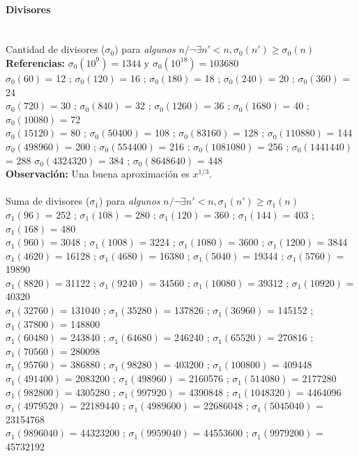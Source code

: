 {\paragraph{Divisores} \ \\
Cantidad de divisores ($\sigma_0$) para \emph{algunos} $n / \neg\exists n'<n, \sigma_0(n') \geqslant \sigma_0(n)$ \\
\textbf{Referencias:} $\sigma_0(10^9) = 1344$ y $\sigma_0(10^{18}) = 103680$ \\
$\sigma_0(60)$ = 12 ; $\sigma_0(120)$ = 16 ; $\sigma_0(180)$ = 18 ; $\sigma_0(240)$ = 20 ; $\sigma_0(360)$ = 24 \\
$\sigma_0(720)$ = 30 ; $\sigma_0(840)$ = 32 ; $\sigma_0(1260)$ = 36 ; $\sigma_0(1680)$ = 40 ; $\sigma_0(10080)$ = 72 \\ $\sigma_0(15120)$ = 80 ; $\sigma_0(50400)$ = 108 ; $\sigma_0(83160)$ = 128 ; $\sigma_0(110880)$ = 144 \\
$\sigma_0(498960)$ = 200 ; $\sigma_0(554400)$ = 216 ; $\sigma_0(1081080)$ = 256 ; $\sigma_0(1441440)$ = 288  $\sigma_0(4324320)$ = 384 ; $\sigma_0(8648640)$ = 448 \\
\textbf{Observación:} Una buena aproximación es $x^{1/3}$. \\ \\
%
Suma de divisores ($\sigma_1$) para \emph{algunos} $n / \neg\exists n'<n, \sigma_1(n') \geqslant \sigma_1(n)$ \\
$\sigma_1(96)$ = 252 ; $\sigma_1(108)$ = 280 ; $\sigma_1(120)$ = 360 ; $\sigma_1(144)$ = 403 ; $\sigma_1(168)$ = 480 \\
$\sigma_1(960)$ = 3048 ; $\sigma_1(1008)$ = 3224 ; $\sigma_1(1080)$ = 3600 ; $\sigma_1(1200)$ = 3844 \\
$\sigma_1(4620)$ = 16128 ; $\sigma_1(4680)$ = 16380 ; $\sigma_1(5040)$ = 19344 ; $\sigma_1(5760)$ = 19890 \\
$\sigma_1(8820)$ = 31122 ; $\sigma_1(9240)$ = 34560 ; $\sigma_1(10080)$ = 39312 ; $\sigma_1(10920)$ = 40320 \\
$\sigma_1(32760)$ = 131040 ; $\sigma_1(35280)$ = 137826 ; $\sigma_1(36960)$ = 145152 ; $\sigma_1(37800)$ = 148800 \\
$\sigma_1(60480)$ = 243840 ; $\sigma_1(64680)$ = 246240 ; $\sigma_1(65520)$ = 270816 ; $\sigma_1(70560)$ = 280098 \\
$\sigma_1(95760)$ = 386880 ; $\sigma_1(98280)$ = 403200 ; $\sigma_1(100800)$ = 409448  \\
$\sigma_1(491400)$ = 2083200 ; $\sigma_1(498960)$ = 2160576 ; $\sigma_1(514080)$ = 2177280 \\
$\sigma_1(982800)$ = 4305280 ; $\sigma_1(997920)$ = 4390848 ; $\sigma_1(1048320)$ = 4464096 \\
$\sigma_1(4979520)$ = 22189440 ; $\sigma_1(4989600)$ = 22686048 ; $\sigma_1(5045040)$ = 23154768 \\
$\sigma_1(9896040)$ = 44323200 ; $\sigma_1(9959040)$ = 44553600 ; $\sigma_1(9979200)$ = 45732192
%
%


}
